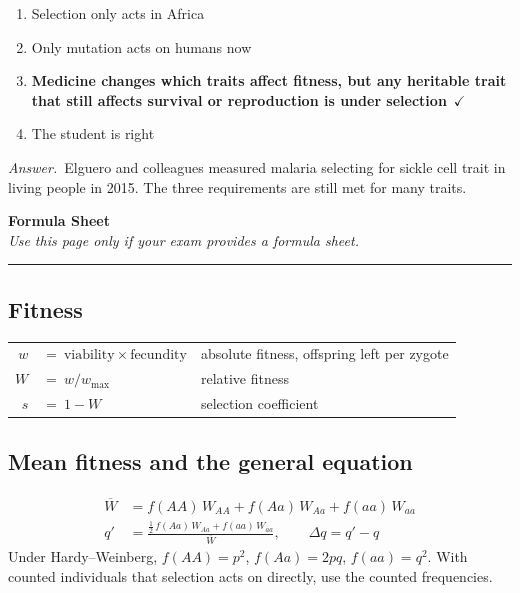\documentclass[11pt]{article}
\newcommand{\keyans}[1]{\par\medskip\noindent\textit{Answer.}\ #1\par\medskip}
\begin{document}
\begin{enumerate}[label=\textbf{\arabic*.}, leftmargin=2em, itemsep=1.4em]
\begin{enumerate}[label={}, leftmargin=2.4em, labelwidth=0pt, itemsep=2pt, topsep=0pt]
\item \hspace*{-2.4em}Selection only acts in Africa
\item \hspace*{-2.4em}Only mutation acts on humans now
\item \hspace*{-2.4em}\textbf{Medicine changes which traits affect fitness, but any heritable trait that still affects survival or reproduction is under selection}\ \(\checkmark\)
\item \hspace*{-2.4em}The student is right
\end{enumerate}
\keyans{Elguero and colleagues measured malaria selecting for sickle cell trait in living people in 2015. The three requirements are still met for many traits.}
\end{enumerate}

\newpage
\begin{center}
  {\Large\bfseries Formula Sheet}\\[3pt]
  {\small\itshape Use this page only if your exam provides a formula sheet.}\\[2pt]
  \rule{\textwidth}{0.4pt}
\end{center}

\subsection*{Fitness}
\begin{center}\renewcommand{\arraystretch}{2.1}
\begin{tabular}{r@{\;}l@{\qquad}l}
  \(w\) & \(=\ \text{viability} \times \text{fecundity}\) & absolute fitness, offspring left per zygote\\
  \(W\) & \(=\ w / w_{\max}\) & relative fitness\\
  \(s\) & \(=\ 1 - W\) & selection coefficient
\end{tabular}\end{center}

\subsection*{Mean fitness and the general equation}
\begin{align*}
  \overline{W} &= f(AA)\,W_{AA} + f(Aa)\,W_{Aa} + f(aa)\,W_{aa}\\[4pt]
  q' &= \frac{\tfrac{1}{2}\,f(Aa)\,W_{Aa} + f(aa)\,W_{aa}}{\overline{W}}, \qquad \Delta q = q' - q
\end{align*}
Under Hardy--Weinberg, \(f(AA)=p^2\), \(f(Aa)=2pq\), \(f(aa)=q^2\). With counted individuals that selection acts on directly, use the counted frequencies.
\end{document}
